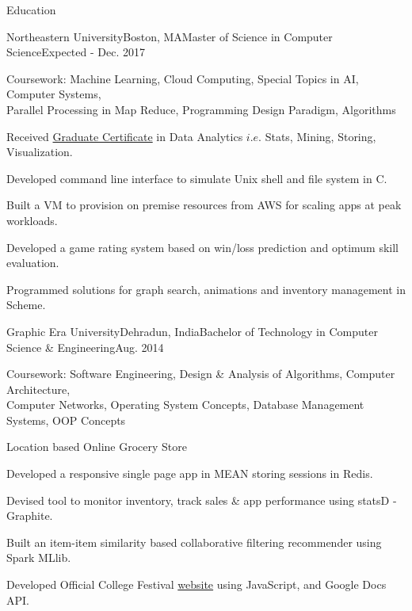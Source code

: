 \documentclass{resume} %
\begin{document}

\begin{rSection}{Education}

\begin{rSubsection}{Northeastern University}{Boston, MA}{Master of Science in Computer Science}{Expected - Dec. 2017}
\item Coursework: Machine Learning, Cloud Computing, Special Topics in AI, Computer Systems, \\ Parallel Processing in Map Reduce, Programming Design Paradigm, Algorithms
\item Received \href{http://www.northeastern.edu/data-analytics/data-science-certificate/}{Graduate Certificate} in Data Analytics $i.e.$ Stats, Mining, Storing, Visualization.
\item Developed command line interface to simulate Unix shell and file system in C.
\item Built a VM to provision on premise resources from AWS for scaling apps at peak workloads.
\item Developed a game rating system based on win/loss prediction and optimum skill evaluation.
\item Programmed solutions for graph search, animations and inventory management in Scheme.
\end{rSubsection}

\begin{rSubsection}{Graphic Era University}{Dehradun, India}{Bachelor of Technology in Computer Science \& Engineering}{Aug. 2014}
\item Coursework: Software Engineering, Design \& Analysis of Algorithms, Computer Architecture, \\ Computer Networks, Operating System Concepts, Database Management Systems, OOP Concepts
\item Location based Online Grocery Store
\begin{rSubsubsection}
\item Developed a responsive single page app in MEAN storing sessions in Redis.
\item Devised tool to monitor inventory, track sales \& app performance using statsD - Graphite.
\item Built an item-item similarity based collaborative filtering recommender using Spark MLlib.
\end{rSubsubsection}
\item Developed Official College Festival \href{http://iblong2iyush.github.io/grafest}{website} using JavaScript, and Google Docs API.
\end{rSubsection}

\end{rSection}
\end{document}
